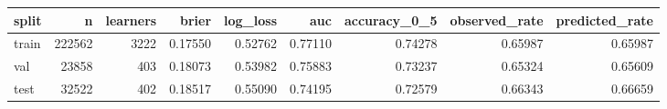 \begin{tabular}{lrrrrrrrr}
\toprule
split & n & learners & brier & log\_loss & auc & accuracy\_0\_5 & observed\_rate & predicted\_rate \\
\midrule
train & 222562 & 3222 & 0.17550 & 0.52762 & 0.77110 & 0.74278 & 0.65987 & 0.65987 \\
val & 23858 & 403 & 0.18073 & 0.53982 & 0.75883 & 0.73237 & 0.65324 & 0.65609 \\
test & 32522 & 402 & 0.18517 & 0.55090 & 0.74195 & 0.72579 & 0.66343 & 0.66659 \\
\bottomrule
\end{tabular}
